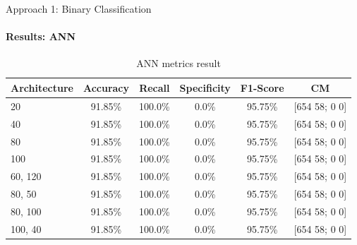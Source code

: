 \documentclass[9pt, pstricks, xcolor=dvipsnames]{beamer}
\begin{document}
\begin{frame}{Approach 1: Binary Classification}
	\framesubtitle{Results: ANN}
	\begin{table}[H]
		\centering
		\begin{tabular}{lccccc}
			\toprule
			Architecture & Accuracy & Recall  & Specificity & F1-Score & CM            \\
			\midrule
			20           & 91.85\%  & 100.0\% & 0.0\%       & 95.75\%  & [654 58; 0 0] \\
			40           & 91.85\%  & 100.0\% & 0.0\%       & 95.75\%  & [654 58; 0 0] \\
			80           & 91.85\%  & 100.0\% & 0.0\%       & 95.75\%  & [654 58; 0 0] \\
			100          & 91.85\%  & 100.0\% & 0.0\%       & 95.75\%  & [654 58; 0 0] \\
			60, 120      & 91.85\%  & 100.0\% & 0.0\%       & 95.75\%  & [654 58; 0 0] \\
			80, 50       & 91.85\%  & 100.0\% & 0.0\%       & 95.75\%  & [654 58; 0 0] \\
			80, 100      & 91.85\%  & 100.0\% & 0.0\%       & 95.75\%  & [654 58; 0 0] \\
			100, 40      & 91.85\%  & 100.0\% & 0.0\%       & 95.75\%  & [654 58; 0 0] \\

			\bottomrule
		\end{tabular}
		\caption{ANN metrics result}
		\label{tab:ann_approach1}
	\end{table}
\end{frame}
\end{document}
